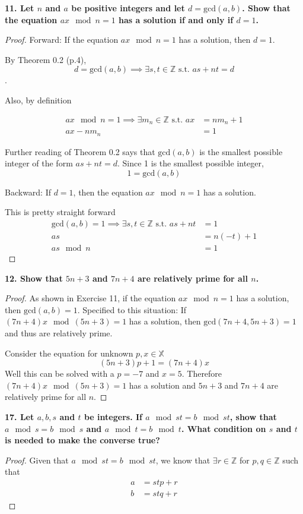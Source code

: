 \textbf{11. Let $n$ and $a$ be positive integers and let $d=\text{gcd}(a,b)$. Show that the equation $ax\mod n = 1$ has a solution if and only if $d=1$.}

\begin{proof}
Forward: If the equation $ax\mod n = 1$ has a solution, then $d=1$.

By Theorem 0.2 (p.4),
 \[ d=\text{gcd}(a,b) \implies \exists s,t \in \mathbb{Z} \text{ s.t. } as + nt = d\].

 Also, by definition

 \begin{align*}
 ax\mod n = 1 \implies \exists m_n \in \mathbb{Z} \text{ s.t. } ax &= nm_n + 1 \\
 ax - nm_n &= 1
 \end{align*}

Further reading of Theorem 0.2 says that $\text{gcd}(a,b)$ is the smallest possible integer of the form $as + nt = d$. Since 1 is the smallest possible integer, 
\[1 = \text{gcd}(a,b)\]

Backward: If $d=1$, then the equation $ax\mod n = 1$ has a solution.

This is pretty straight forward
\begin{align*}
\text{gcd}(a,b) = 1 \implies \exists s,t \in \mathbb{Z} \text{ s.t. } as + nt &= 1 \\
as &= n (-t) + 1\\
as \mod n &= 1
\end{align*}
\end{proof}

\textbf{12. Show that $5n + 3$ and $7n + 4$ are relatively prime for all $n$.}

\begin{proof}
As shown in Exercise 11, if the equation $ax\mod n = 1$ has a solution, then $\text{gcd}(a,b)=1$. Specified to this situation: If $(7n+4)x\mod(5n+3)=1$ has a solution, then $\text{gcd}(7n+4,5n+3)=1$ and thus are relatively prime.

Consider the equation for unknown $p,x \in \mathbb{X}$
\[(5n+3)p + 1 = (7n+4)x\]
Well this can be solved with a $p=-7$ and $x=5$. Therefore $(7n+4)x\mod(5n+3)=1$ has a solution and $5n + 3$ and $7n + 4$ are relatively prime for all $n$.
\end{proof}

\textbf{17. Let $a,b,s$ and $t$ be integers. If $a \mod st = b \mod st$, show that $a \mod s = b \mod s$ and $a \mod t = b \mod t$. What condition on $s$ and $t$ is needed to make the converse true?}

\begin{proof}
Given that $a \mod st = b \mod st$, we know that $\exists r \in \mathbb{Z}$ for $p, q \in \mathbb{Z}$ such that
\begin{align*}
a &= stp + r \\
b &= stq + r
\end{align*}
\end{proof}
